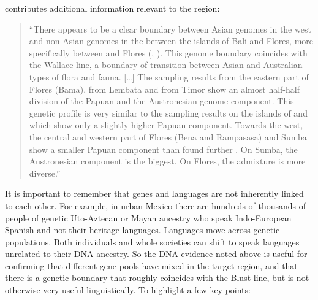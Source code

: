 \citet[22]{Fricke2019} contributes additional information
relevant to the region:

\begin{quote}
	``There appears to be a clear boundary between Asian genomes in the west
	and non-Asian genomes in the  between the islands of Bali
	and Flores, more specifically between 
	and Flores 
	(\citealp[1837f]{KarafetHammer2010}, \citealp[2447]{HudjashovCox2017}).
	This genome boundary coincides with the Wallace line,
	a boundary of transition between Asian
	and Australian types of flora and fauna.
	[{\ldots}] The sampling results from the eastern part of Flores (Bama),
	from Lembata and from Timor show an almost half-half division of the Papuan
	and the Austronesian genome component.
	This genetic profile is very similar to the sampling results on the islands of 
	and  which show only a slightly higher Papuan component.
	Towards the west, the central
	and western part of Flores (Bena
	and Rampasasa) and Sumba show a smaller Papuan component than found further .
	On Sumba, the Austronesian component is the biggest.
	On Flores, the admixture is more diverse.'' \citep[22]{Fricke2019}
\end{quote}

It is important to remember that genes
and languages are not inherently linked to each other.
For example, in urban Mexico there are hundreds of
thousands of people of genetic Uto-Aztecan or Mayan
ancestry who speak Indo-European Spanish
and not their heritage languages.
Languages move across genetic populations.
Both individuals and whole societies can shift
to speak languages unrelated to their DNA ancestry.
So the DNA evidence noted above is useful for confirming
that different gene pools have mixed in the
target region, and that there is a genetic boundary
that roughly coincides with the Blust line,
but is not otherwise very useful linguistically.
To highlight a few key points:

